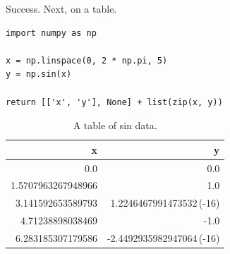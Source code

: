 \documentclass[11pt]{article}
\begin{document}
Success. Next, on a table.

\begin{verbatim}
import numpy as np

x = np.linspace(0, 2 * np.pi, 5)
y = np.sin(x)

return [['x', 'y'], None] + list(zip(x, y))
\end{verbatim}

\begin{org}
\begin{table}[H]
\caption{A table of sin data. \label{tab-sin}}
\centering
\begin{tabular}{rr}
x & y\\
\hline
0.0 & 0.0\\
1.5707963267948966 & 1.0\\
3.141592653589793 & 1.2246467991473532\,(-16)\\
4.71238898038469 & -1.0\\
6.283185307179586 & -2.4492935982947064\,(-16)\\
\end{tabular}
\end{table}
\end{org}
\end{document}
